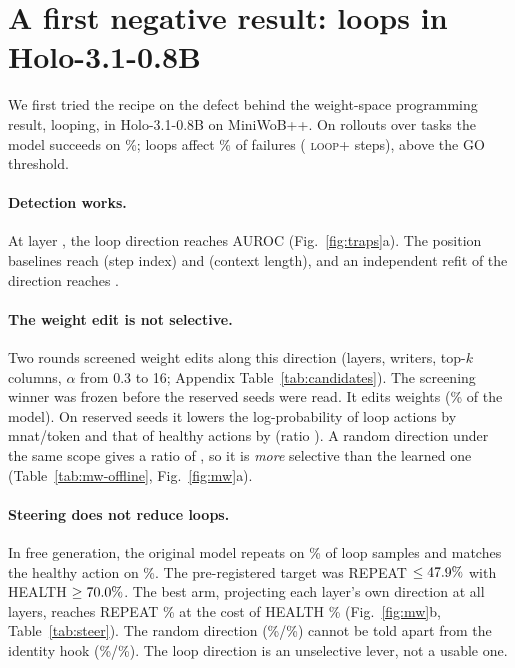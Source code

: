 \section{A first negative result: loops in Holo-3.1-0.8B}
\label{sec:mw}
We first tried the recipe on the defect behind the weight-space programming result, looping, in Holo-3.1-0.8B on MiniWoB++. On \mwNNormal{} rollouts over \mwNTasks{} tasks the model succeeds on \mwSuccessPct\%; loops affect \mwLoopSharePct\% of failures (\mwLoopPos{} \textsc{loop+} steps), above the GO threshold.

\paragraph{Detection works.} At layer \mwAucBestLayer, the loop direction reaches AUROC \mwAucBestExact{} (Fig.~\ref{fig:traps}a). The position baselines reach \mwAucStep{} (step index) and \mwAucCtx{} (context length), and an independent refit of the direction reaches \mwAstraAuc.

\paragraph{The weight edit is not selective.} Two rounds screened \mwOffNCand{} weight edits along this direction (layers, writers, top-$k$ columns, $\alpha$ from 0.3 to 16; Appendix Table~\ref{tab:candidates}). The screening winner was frozen before the reserved seeds were read. It edits \mwPatchChanged{} weights (\mwPatchPct\% of the model). On reserved seeds it lowers the log-probability of loop actions by \mwFinLoopDec{} mnat/token and that of healthy actions by \mwFinHealthyDec{} (ratio \mwFinRatio). A random direction under the same scope gives a ratio of \mwFinRatioRand, so it is \emph{more} selective than the learned one (Table~\ref{tab:mw-offline}, Fig.~\ref{fig:mw}a).

\paragraph{Steering does not reduce loops.} In free generation, the original model repeats on \mwStBaseRepeat\% of loop samples and matches the healthy action on \mwStBaseHealth\%. The pre-registered target was REPEAT $\le47.9\%$ with HEALTH $\ge70.0\%$. The best arm, projecting each layer's own direction at all layers, reaches REPEAT \mwStNativeRepeat\% at the cost of HEALTH \mwStNativeHealth\% (Fig.~\ref{fig:mw}b, Table~\ref{tab:steer}). The random direction (\mwStRandRepeat\%/\mwStRandHealth\%) cannot be told apart from the identity hook (\mwStIdentRepeat\%/\mwStIdentHealth\%). The loop direction is an unselective lever, not a usable one.

